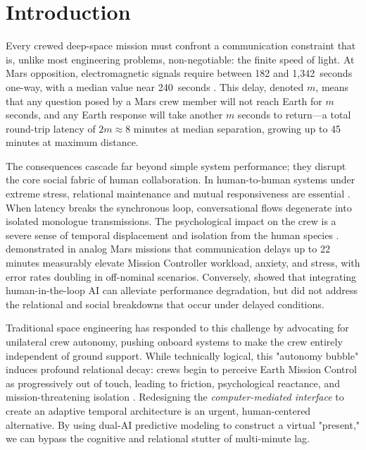 \documentclass[ASNA,twocolumn]{USG}
\begin{document}
\maketitle

\section{Introduction}

Every crewed deep-space mission must confront a communication constraint that is,
unlike most engineering problems, non-negotiable: the finite speed of light.
At Mars opposition, electromagnetic signals require between 182 and 1{,}342~seconds
one-way, with a median value near 240~seconds \cite{nasa_ola_2023}.
This delay, denoted \(m\), means that any question posed by a Mars crew member
will not reach Earth for \(m\) seconds, and any Earth response will take another
\(m\) seconds to return---a total round-trip latency of \(2m \approx 8\) minutes
at median separation, growing up to 45 minutes at maximum distance.

The consequences cascade far beyond simple system performance; they disrupt the core
social fabric of human collaboration. In human-to-human systems under extreme stress,
relational maintenance and mutual responsiveness are essential \cite{walther1992}.
When latency breaks the synchronous loop, conversational flows degenerate into
isolated monologue transmissions. The psychological impact on the crew is a severe sense of
temporal displacement and isolation from the human species \cite{kanas2017}.
\cite{diamond2025} demonstrated in analog Mars missions that communication
delays up to 22 minutes measurably elevate Mission Controller workload, anxiety, and stress,
with error rates doubling in off-nominal scenarios.
Conversely, \cite{mavrakis2025} showed that integrating human-in-the-loop AI
can alleviate performance degradation, but did not address the relational and social
breakdowns that occur under delayed conditions.

Traditional space engineering has responded to this challenge by advocating for
unilateral crew autonomy, pushing onboard systems to make the crew entirely independent
of ground support. While technically logical, this "autonomy bubble" induces profound
relational decay: crews begin to perceive Earth Mission Control as progressively out of touch,
leading to friction, psychological reactance, and mission-threatening isolation
\cite{kanas2017}. Redesigning the \textit{computer-mediated interface} to create an
adaptive temporal architecture is an urgent, human-centered alternative.
By using dual-AI predictive modeling to construct a virtual "present," we can bypass
the cognitive and relational stutter of multi-minute lag.
\end{document}
